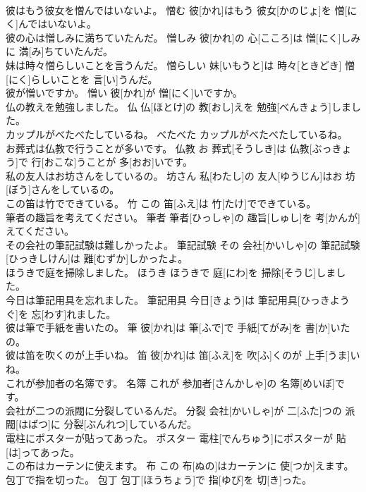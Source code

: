 \documentclass[8pt]{extreport}
\begin{document}
\begin{CJK}{UTF8}{min}
\\	彼はもう彼女を憎んではいないよ。	憎む	彼[かれ]はもう 彼女[かのじょ]を 憎[にく]んではいないよ。	
\\	彼の心は憎しみに満ちていたんだ。	憎しみ	彼[かれ]の 心[こころ]は 憎[にく]しみに 満[み]ちていたんだ。	
\\	妹は時々憎らしいことを言うんだ。	憎らしい	妹[いもうと]は 時々[ときどき] 憎[にく]らしいことを 言[い]うんだ。	
\\	彼が憎いですか。	憎い	彼[かれ]が 憎[にく]いですか。	
\\	仏の教えを勉強しました。	仏	仏[ほとけ]の 教[おし]えを 勉強[べんきょう]しました。	
\\	カップルがべたべたしているね。	べたべた	カップルがべたべたしているね。	
\\	お葬式は仏教で行うことが多いです。	仏教	お 葬式[そうしき]は 仏教[ぶっきょう]で 行[おこな]うことが 多[おお]いです。	
\\	私の友人はお坊さんをしているの。	坊さん	私[わたし]の 友人[ゆうじん]はお 坊[ぼう]さんをしているの。	
\\	この笛は竹でできている。	竹	この 笛[ふえ]は 竹[たけ]でできている。	
\\	筆者の趣旨を考えてください。	筆者	筆者[ひっしゃ]の 趣旨[しゅし]を 考[かんが]えてください。	
\\	その会社の筆記試験は難しかったよ。	筆記試験	その 会社[かいしゃ]の 筆記試験[ひっきしけん]は 難[むずか]しかったよ。	
\\	ほうきで庭を掃除しました。	ほうき	ほうきで 庭[にわ]を 掃除[そうじ]しました。	
\\	今日は筆記用具を忘れました。	筆記用具	今日[きょう]は 筆記用具[ひっきようぐ]を 忘[わす]れました。	
\\	彼は筆で手紙を書いたの。	筆	彼[かれ]は 筆[ふで]で 手紙[てがみ]を 書[か]いたの。	
\\	彼は笛を吹くのが上手いね。	笛	彼[かれ]は 笛[ふえ]を 吹[ふ]くのが 上手[うま]いね。	
\\	これが参加者の名簿です。	名簿	これが 参加者[さんかしゃ]の 名簿[めいぼ]です。	
\\	会社が二つの派閥に分裂しているんだ。	分裂	会社[かいしゃ]が 二[ふた]つの 派閥[はばつ]に 分裂[ぶんれつ]しているんだ。	
\\	電柱にポスターが貼ってあった。	ポスター	電柱[でんちゅう]にポスターが 貼[は]ってあった。	
\\	この布はカーテンに使えます。	布	この 布[ぬの]はカーテンに 使[つか]えます。	
\\	包丁で指を切った。	包丁	包丁[ほうちょう]で 指[ゆび]を 切[き]った。	

\end{CJK}
\end{document}
